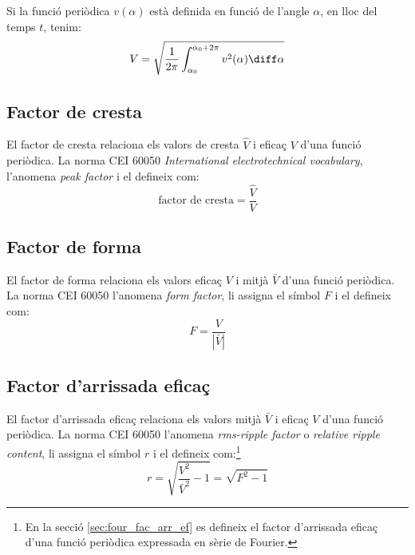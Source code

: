 Si la funció periòdica $v(\alpha)$ està definida en funció de
l'angle $\alpha$, en lloc del temps $t$, tenim:
\begin{equation}
    V = \sqrt{\frac{1}{2\pi} \int_{\alpha_0}^{\alpha_0+2\pi}
     v^2(\alpha) \diff \alpha}
\end{equation}

\subsection{Factor de cresta}

El factor de cresta relaciona els valors de cresta $\hat{V}$
  i eficaç $V$ d'una funció periòdica. La norma CEI 60050 \textit{International electrotechnical vocabulary}, l'anomena \textit{peak factor} i el defineix com:
\begin{equation}
     \text{factor de cresta} = \frac{\hat{V}}{V}
\end{equation}

\subsection{Factor de forma}

El factor de forma relaciona els valors eficaç $V$
i mitjà $\bar{V}$ d'una funció periòdica. La norma CEI 60050 l'anomena \textit{form factor}, li assigna el símbol $F$ i el defineix com:
\begin{equation}
    F = \frac{V}{|\bar{V}|}
\end{equation}

\subsection{Factor d'arrissada eficaç}

El factor d'arrissada eficaç relaciona els
valors mitjà $\bar{V}$ i eficaç $V$ d'una funció periòdica.
La norma CEI 60050 l'anomena \textit{rms-ripple factor} o \textit{relative ripple content}, li assigna el símbol $r$ i el defineix com:\footnote{En la secció \ref{sec:four_fac_arr_ef} es defineix el factor d'arrissada eficaç d'una funció periòdica expressada en sèrie de Fourier.}
\begin{equation}
    r = \sqrt{\frac{V^2}{\bar{V}^2}-1} = \sqrt{F^2-1}\label{eq:rms_rip}
\end{equation}

